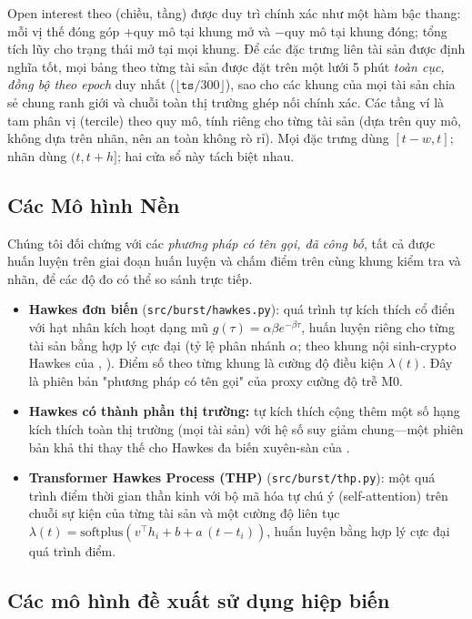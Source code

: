 \documentclass[11pt,a4paper]{article}
\begin{document}
Open interest theo (chiều, tầng) được duy trì chính xác như một hàm bậc thang: mỗi vị thế đóng góp $+\text{quy mô}$ tại khung mở và $-\text{quy mô}$ tại khung đóng; tổng tích lũy cho trạng thái mở tại mọi khung. Để các đặc trưng liên tài sản được định nghĩa tốt, mọi bảng theo từng tài sản được đặt trên một lưới 5 phút \emph{toàn cục, đồng bộ theo epoch} duy nhất ($\lfloor \texttt{ts}/300\rfloor$), sao cho các khung của mọi tài sản chia sẻ chung ranh giới và chuỗi toàn thị trường ghép nối chính xác. Các tầng ví là tam phân vị (tercile) theo quy mô, tính riêng cho từng tài sản (dựa trên quy mô, không dựa trên nhãn, nên an toàn không rò rỉ). Mọi đặc trưng dùng $[t-w, t]$; nhãn dùng $(t, t+h]$; hai cửa sổ này tách biệt nhau.

\subsection{Các Mô hình Nền}

Chúng tôi đối chứng với các \emph{phương pháp có tên gọi, đã công bố}, tất cả được huấn luyện trên giai đoạn huấn luyện và chấm điểm trên cùng khung kiểm tra và nhãn, để các độ đo có thể so sánh trực tiếp.

\begin{itemize}[nosep]
    \item \textbf{Hawkes đơn biến} (\texttt{src/burst/hawkes.py}): quá trình tự kích thích cổ điển với hạt nhân kích hoạt dạng mũ $g(\tau)=\alpha\beta e^{-\beta\tau}$, huấn luyện riêng cho từng tài sản bằng hợp lý cực đại (tỷ lệ phân nhánh $\alpha$; theo khung nội sinh-crypto Hawkes của \citet{bacry2015hawkes}, \citet{hardiman2013endogeneity}). Điểm số theo từng khung là cường độ điều kiện $\lambda(t)$. Đây là phiên bản "phương pháp có tên gọi" của proxy cường độ trễ M0.
    \item \textbf{Hawkes có thành phần thị trường:} tự kích thích cộng thêm một số hạng kích thích toàn thị trường (mọi tài sản) với hệ số suy giảm chung---một phiên bản khả thi thay thế cho Hawkes đa biến xuyên-sàn của \citet{cao2025defi}.
    \item \textbf{Transformer Hawkes Process (THP)} (\texttt{src/burst/thp.py}): một quá trình điểm thời gian thần kinh \citep{zuo2020thp} với bộ mã hóa tự chú ý (self-attention) trên chuỗi sự kiện của từng tài sản và một cường độ liên tục $\lambda(t)=\text{softplus}(v^\top h_i + b + a\,(t-t_i))$, huấn luyện bằng hợp lý cực đại quá trình điểm.
\end{itemize}

\subsection{Các mô hình đề xuất sử dụng hiệp biến}
\end{document}
